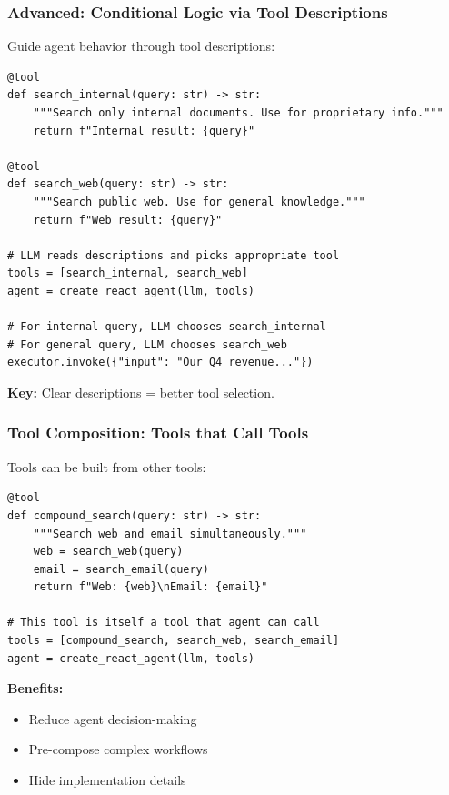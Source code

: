 \documentclass[aspectratio=169,11pt]{beamer}
\begin{document}
\begin{frame}[fragile]
\frametitle{Advanced: Conditional Logic via Tool Descriptions}

Guide agent behavior through tool descriptions:

\begin{lstlisting}
@tool
def search_internal(query: str) -> str:
    """Search only internal documents. Use for proprietary info."""
    return f"Internal result: {query}"

@tool
def search_web(query: str) -> str:
    """Search public web. Use for general knowledge."""
    return f"Web result: {query}"

# LLM reads descriptions and picks appropriate tool
tools = [search_internal, search_web]
agent = create_react_agent(llm, tools)

# For internal query, LLM chooses search_internal
# For general query, LLM chooses search_web
executor.invoke({"input": "Our Q4 revenue..."})
\end{lstlisting}

\textbf{Key:} Clear descriptions = better tool selection.

\end{frame}

\begin{frame}[fragile]
\frametitle{Tool Composition: Tools that Call Tools}

Tools can be built from other tools:

\begin{lstlisting}
@tool
def compound_search(query: str) -> str:
    """Search web and email simultaneously."""
    web = search_web(query)
    email = search_email(query)
    return f"Web: {web}\nEmail: {email}"

# This tool is itself a tool that agent can call
tools = [compound_search, search_web, search_email]
agent = create_react_agent(llm, tools)
\end{lstlisting}

\textbf{Benefits:}
\begin{itemize}
  \item Reduce agent decision-making
  \item Pre-compose complex workflows
  \item Hide implementation details
\end{itemize}

\end{frame}
\end{document}
